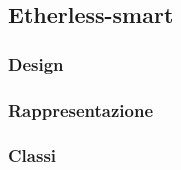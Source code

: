\subsection{Etherless-smart}
\subsubsection{Design}
\subsubsection{Rappresentazione}
\subsubsection{Classi}


